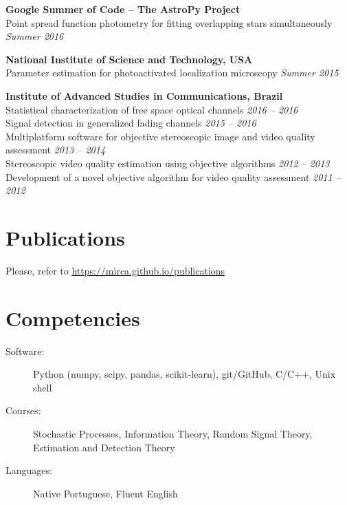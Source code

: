 \documentclass[10pt]{article}
\begin{document}
\begin{titlepage}
    \textbf{Google Summer of Code -- The AstroPy Project}\\
    Point spread function photometry for fitting overlapping stars simultaneously
    \hfill \textit{Summer 2016}
    \vspace{.5cm}

    \textbf{National Institute of Science and Technology, USA}\\
    Parameter estimation for photoactivated localization microscopy
    \hfill \textit{Summer 2015}
    \vspace{.5cm}

    \textbf{Institute of Advanced Studies in Communications, Brazil}\\
    Statistical characterization of free space optical channels \hfill \emph{2016 -- 2016}  \\
    Signal detection in generalized fading channels \hfill \emph{2015 -- 2016} \\
    Multiplatform software for objective stereoscopic image and video quality assessment \hfill \emph{2013 -- 2014} \\
    Stereoscopic video quality estimation using objective algorithms \hfill \emph{2012 -- 2013} \\
    Development of a novel objective algorithm for video quality assessment \hfill \emph{2011 -- 2012}

\section*{Publications}
Please, refer to \url{https://mirca.github.io/publications}

\section*{Competencies}
\begin{description}
    \item[Software:] Python (numpy, scipy, pandas, scikit-learn), git/GitHub, C/C++, Unix shell
    \item[Courses:] Stochastic Processes, Information Theory, Random Signal Theory, Estimation and Detection Theory
    \item[Languages:] Native Portuguese, Fluent English
\end{description}


\end{titlepage}
\end{document}
